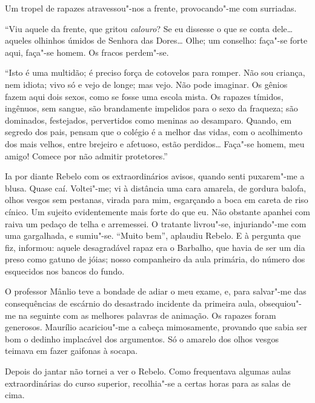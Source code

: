 
Um tropel de rapazes atravessou"-nos a
frente, provocando"-me com surriadas. 

``Viu aquele da frente, que
gritou \textit{calouro}? Se eu dissesse o que se conta dele\ldots{} aqueles olhinhos
úmidos de Senhora das Dores\ldots{} Olhe; um conselho: faça"-se forte aqui,
faça"-se homem. Os fracos perdem"-se. 

``Isto é uma multidão; é preciso
força de cotovelos para romper. Não sou criança, nem idiota; vivo só e
vejo de longe; mas vejo. Não pode imaginar. Os gênios fazem aqui dois
sexos, como se fosse uma escola mista. Os rapazes tímidos, ingênuos,
sem sangue, são brandamente impelidos para o sexo da fraqueza; são
dominados, festejados, pervertidos como meninas ao desamparo. Quando,
em segredo dos pais, pensam que o colégio é a melhor das vidas, com o
acolhimento dos mais velhos, entre brejeiro e afetuoso, estão
perdidos\ldots{} Faça"-se homem, meu amigo! Comece por não admitir
protetores.'' 

Ia por diante Rebelo com os extraordinários avisos, quando
senti puxarem"-me a blusa. Quase caí. Voltei"-me; vi à distância uma
cara amarela, de gordura balofa, olhos vesgos sem pestanas, virada para
mim, esgarçando a boca em careta de riso cínico. Um sujeito
evidentemente mais forte do que eu. Não obstante apanhei com raiva um
pedaço de telha e arremessei. O tratante livrou"-se, injuriando"-me
com uma gargalhada, e sumiu"-se. ``Muito bem'', aplaudiu Rebelo. E à
pergunta que fiz, informou: aquele desagradável rapaz era o Barbalho,
que havia de ser um dia preso como gatuno de jóias; nosso companheiro
da aula primária, do número dos esquecidos nos bancos do fundo. 


O professor Mânlio teve a bondade de adiar o meu exame, e, para
salvar"-me das consequências de escárnio do desastrado incidente da
primeira aula, obsequiou"-me na seguinte com as melhores palavras de
animação. Os rapazes foram generosos. Maurílio acariciou"-me a cabeça
mimosamente, provando que sabia ser bom o dedinho implacável dos
argumentos. Só o amarelo dos olhos vesgos teimava em fazer gaifonas à
socapa. 

Depois do jantar não tornei a ver o Rebelo. Como frequentava
algumas aulas extraordinárias do curso superior, recolhia"-se a certas
horas para as salas de cima. 

